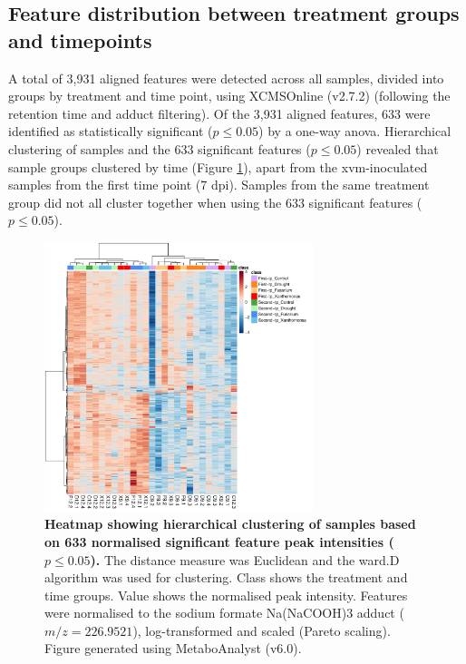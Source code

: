 \subsection{Feature distribution between treatment groups and timepoints}

A total of 3,931 aligned features were detected across all samples, divided into groups by treatment and time point, using XCMSOnline (v2.7.2) \parencite[]{Gowda2014} (following the retention time and adduct filtering). Of the 3,931 aligned features, 633 were identified as statistically significant ($p \le0.05$) by a one-way \ac{anova}. Hierarchical clustering of samples and the 633 significant features ($p \le0.05$) revealed that sample groups clustered by time (Figure \ref{fig:Sig657FeaturesRedSamples}), apart from the \ac{xvm}-inoculated samples from the first time point (7 \ac{dpi}). Samples from the same treatment group did not all cluster together when using the 633 significant features ($p \le0.05$).

\begin{figure}[h!]
    \centering
    \includegraphics[width=0.7\textwidth]{Figures/Sig633FeaturesRedSamplesRedGroups_ForThesis.pdf}
    \caption[Heatmap showing hierarchical clustering of samples based on 633 normalised significant feature peak intensities ($p \le0.05$).]{\textbf{Heatmap showing hierarchical clustering of samples based on 633 normalised significant feature peak intensities ($p \le0.05$).} The distance measure was Euclidean and the ward.D algorithm was used for clustering. Class shows the treatment and time groups. Value shows the normalised peak intensity. Features were normalised to the sodium formate Na(NaCOOH)3 adduct ($m/z=226.9521$), log-transformed and scaled (Pareto scaling). Figure generated using MetaboAnalyst (v6.0).}
    \label{fig:Sig657FeaturesRedSamples}
\end{figure}

